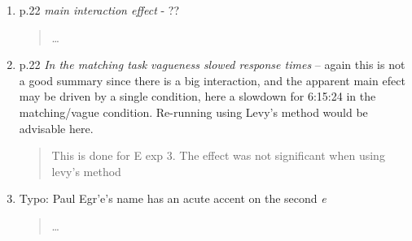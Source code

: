 \documentclass{tufte-handout}
\begin{document}
\begin{enumerate}
\item p.22 \emph{main interaction effect} - ??
\begin{quote}\ldots\end{quote}

\item p.22 \emph{In the matching task vagueness slowed response times} -- again this is not a good summary since there is a big interaction, and the apparent main efect may be driven by a single condition, here a slowdown for 6:15:24 in the matching/vague condition. Re-running using Levy's method would be advisable here.
\begin{quote}This is done for E exp 3. The effect was not significant when using levy's method\end{quote}

\item Typo: Paul Egr\a'e's name has an acute accent on the second \emph{e}
\begin{quote}\ldots\end{quote}

\end{enumerate}
\end{document}
